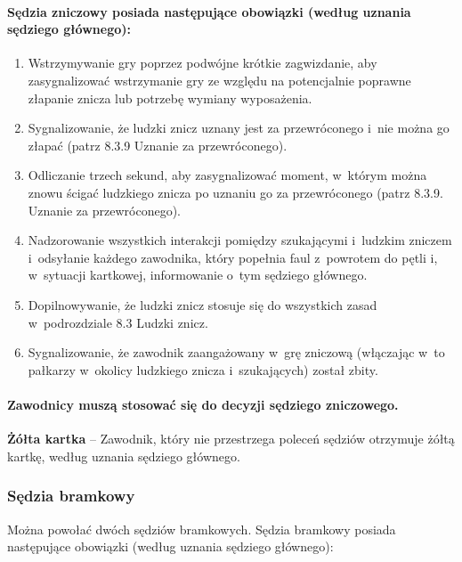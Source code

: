 \documentclass[12pt]{article}
\newcommand\yellowcard[1]{\bgroup\textcolor{darkyellow}{\textbf{#1}}}
\begin{document}
\paragraph{Sędzia zniczowy posiada następujące obowiązki (według
	uznania sędziego głównego):}

\begin{enumerate}
	\item Wstrzymywanie gry poprzez podwójne krótkie zagwizdanie, aby
	      zasygnalizować wstrzymanie gry ze względu na potencjalnie poprawne
	      złapanie znicza lub potrzebę wymiany wyposażenia.

	\item Sygnalizowanie, że ludzki znicz uznany jest za przewróconego i~nie
	      można go złapać (patrz 8.3.9 Uznanie za przewróconego).

	\item Odliczanie trzech sekund, aby zasygnalizować moment, w~którym można
	      znowu ścigać ludzkiego znicza po uznaniu go za przewróconego (patrz
	      8.3.9. Uznanie za przewróconego).

	\item Nadzorowanie wszystkich interakcji pomiędzy szukającymi i~ludzkim
	      zniczem i~odsyłanie każdego zawodnika, który popełnia faul z~powrotem do
	      pętli i, w~sytuacji kartkowej, informowanie o~tym sędziego głównego.

	\item Dopilnowywanie, że ludzki znicz stosuje się do wszystkich zasad w~podrozdziale 8.3 Ludzki znicz.

	\item Sygnalizowanie, że zawodnik zaangażowany w~grę zniczową (włączając w~to pałkarzy w~okolicy ludzkiego znicza i~szukających) został zbity.
\end{enumerate}

\paragraph{Zawodnicy muszą stosować się do decyzji sędziego
	zniczowego.}

\yellowcard{Żółta kartka} -- Zawodnik, który nie przestrzega poleceń sędziów
otrzymuje żółtą kartkę, według uznania sędziego głównego.

\subsubsection{Sędzia bramkowy}

Można powołać dwóch sędziów bramkowych. Sędzia bramkowy posiada
następujące obowiązki (według uznania sędziego głównego):
\end{document}
